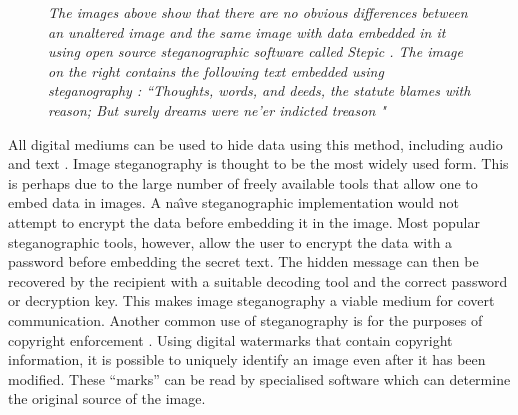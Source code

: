 \begin{figure}[h!]
\caption{\emph{The images above show that there are no obvious differences between an unaltered image and the same image with data embedded in it using open source steganographic software called Stepic \cite{stepnic}. The image on the right contains the following text embedded using steganography : ``Thoughts, words, and deeds, the statute blames with reason;  But surely dreams were ne'er indicted treason \cite{burns}"}}
\label{fig:stegexample}
\end{figure} All digital mediums \cite{pan2007intelligent} can be used to hide data using this method, including audio \cite{crawford2010supraliminal} and text \cite{shirali2006new}. Image steganography is thought to be the most widely used form. This is perhaps due to the large number of freely available tools that allow one to embed data in images. A na\^{\i}ve steganographic implementation would not attempt to encrypt the data before embedding it in the image. Most popular steganographic tools, however, allow the user to encrypt the data with a password before embedding the secret text. The hidden message can then be recovered by the recipient with a suitable decoding tool and the correct password or decryption key. This makes image steganography a viable medium for covert communication.  
Another common use of steganography is for the purposes of copyright enforcement  \cite{kundur2002digital}. Using digital watermarks that contain copyright information,  it is possible to uniquely identify an image even after it has  been modified. These ``marks'' can be read by specialised software which can determine the original source of the image.
